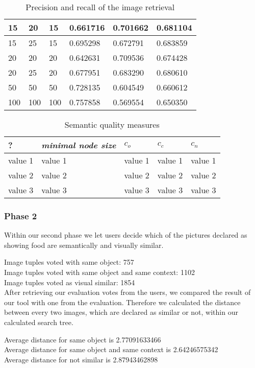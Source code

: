 \begin{table}[h]
\begin{tabular}{| p{2.5cm}| p{2.5cm}| p{2.5cm} || p{1.5cm} | p{1.5cm} | p{1.7cm} |}
    15 	& 20 & 15 & 0.661716 & 0.701662 & 0.681104 \\ \hline    
    15 	& 25 & 15 & 0.695298 & 0.672791 & 0.683859 \\ \hline
    20 	& 20 & 20 & 0.642631 & 0.709536 & 0.674428 \\ \hline
    20 	& 25 & 20 & 0.677951 & 0.683290 & 0.680610 \\ \hline  
    50	& 50 & 50 & 0.728135 & 0.604549 & 0.660612 \\ \hline
    100 	& 100 & 100 & 0.757858 & 0.569554 & 0.650350 \\ \hline
    \end{tabular}
    \caption{Precision and recall of the image retrieval}
	\label{tab_retrievalevaluation}
\end{table}


\begin{table}[h]
    \begin{tabular}{| p{1.8cm} | p{1.8cm} || p{1.5cm} | p{1.5cm} | p{1.5cm} |}
    \hline
    ?	& \emph{minimal node size} & $c_o $ & $c_c$ & $c_n$ \\ \hline
    value 1 		& value 1 	& value 1 	& value 1	& value 1 \\ \hline
    value 2 		& value 2	& value 2 	& value 2	& value 2 \\ \hline
    value 3	 	& value 3	& value 3 	& value 3	& value 3 \\
    \hline
    \end{tabular}
    \caption{Semantic quality measures}
	\label{tab_treeevaluation}
\end{table}

\subsubsection{Phase 2}

Within our second phase we let users decide which of the pictures declared as showing food are semantically and visually similar. 

Image tuples voted with same object: 757 \\
Image tuples voted with same object and same context: 1102 \\
Image tuples voted as visual similar: 1854 \\

After retrieving our evaluation votes from the users, we compared the result of our tool with one from the evaluation. Therefore we calculated the distance between every two images, which are declared as similar or not, within our calculated search tree. 

Average distance for same object  is 2.77091633466  \\
Average distance for same object and same context is 2.64246575342 \\
Average distance for not similar  is 2.87943462898 \\


